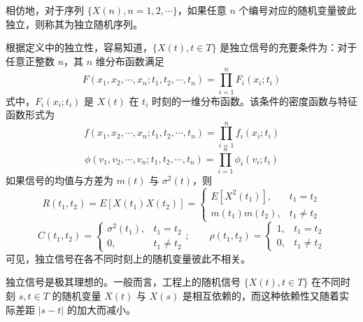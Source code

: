 \documentclass[11pt,openany,UTF8]{ctexbook}
\begin{document}
相仿地\nobreak，对于序列 $\{X(n),n=1,2,\cdots\}$\nobreak，如果任意 $n$ 个编号对应的随机变量彼此独立\nobreak，则称其为独立随机序列\nobreak。

根据定义中的独立性\nobreak，容易知道\nobreak，$\{X(t),t\in T\}$ 是独立信号的充要条件为\nobreak：对于任意正整数 $n$\nobreak，其 $n$ 维分布函数满足
\begin{equation}
F(x_1,x_2,\cdots,x_n;t_1,t_2,\cdots,t_n)=\prod_{i=1}^{n}F_i(x_i;t_i)
\label{eq:2.43}
\end{equation}
式中\nobreak，$F_i(x_i;t_i)$ 是 $X(t)$ 在 $t_i$ 时刻的一维分布函数\nobreak。该条件的密度函数与特征函数形式为
\begin{equation}
f(x_1,x_2,\cdots,x_n;t_1,t_2,\cdots,t_n)=\prod_{i=1}^{n}f_i(x_i;t_i)
\label{eq:2.44}
\end{equation}
\begin{equation}
\phi(v_1,v_2,\cdots,v_n;t_1,t_2,\cdots,t_n)=\prod_{i=1}^{n}\phi_i(v_i;t_i)
\label{eq:2.45}
\end{equation}
如果信号的均值与方差为 $m(t)$ 与 $\sigma^2(t)$\nobreak，则
\begin{equation}
R(t_1,t_2)=E[X(t_1)X(t_2)]=\begin{cases}
E[X^2(t_1)], & t_1=t_2\\
m(t_1)m(t_2), & t_1\neq t_2
\end{cases}
\label{eq:2.46}
\end{equation}
\begin{equation}
C(t_1,t_2)=\begin{cases}
\sigma^2(t_1), & t_1=t_2\\
0, & t_1\neq t_2
\end{cases}
;\qquad
\rho(t_1,t_2)=\begin{cases}
1, & t_1=t_2\\
0, & t_1\neq t_2
\end{cases}
\label{eq:2.47}
\end{equation}
可见\nobreak，独立信号在各不同时刻上的随机变量彼此不相关\nobreak。

独立信号是极其理想的\nobreak。一般而言\nobreak，工程上的随机信号 $\{X(t),t\in T\}$ 在不同时刻 $s,t\in T$ 的随机变量 $X(t)$ 与 $X(s)$ 是相互依赖的\nobreak，而这种依赖性又随着实际差距 $\lvert s-t\rvert$ 的加大而减小\nobreak。
\end{document}
